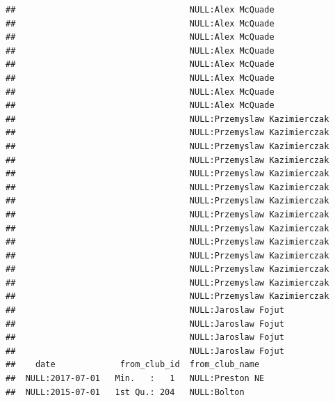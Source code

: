 \documentclass{article}\usepackage[]{graphicx}\usepackage[]{color}
\makeatletter
\newenvironment{kframe}{%
 \def\at@end@of@kframe{}%
 \ifinner\ifhmode%
  \def\at@end@of@kframe{\end{minipage}}%
  \begin{minipage}{\columnwidth}%
 \fi\fi%
 \def\FrameCommand##1{\hskip\@totalleftmargin \hskip-\fboxsep
 \colorbox{shadecolor}{##1}\hskip-\fboxsep
     \hskip-\linewidth \hskip-\@totalleftmargin \hskip\columnwidth}%
 \MakeFramed {\advance\hsize-\width
   \@totalleftmargin\z@ \linewidth\hsize
   \@setminipage}}%
 {\par\unskip\endMakeFramed%
 \at@end@of@kframe}
\newenvironment{knitrout}{}{} %
\makeatother
\begin{document}
\begin{knitrout}
\begin{kframe}
\begin{verbatim}
##                                   NULL:Alex McQuade                                    
##                                   NULL:Alex McQuade                                    
##                                   NULL:Alex McQuade                                    
##                                   NULL:Alex McQuade                                    
##                                   NULL:Alex McQuade                                    
##                                   NULL:Alex McQuade                                    
##                                   NULL:Alex McQuade                                    
##                                   NULL:Alex McQuade                                    
##                                   NULL:Przemyslaw Kazimierczak                         
##                                   NULL:Przemyslaw Kazimierczak                         
##                                   NULL:Przemyslaw Kazimierczak                         
##                                   NULL:Przemyslaw Kazimierczak                         
##                                   NULL:Przemyslaw Kazimierczak                         
##                                   NULL:Przemyslaw Kazimierczak                         
##                                   NULL:Przemyslaw Kazimierczak                         
##                                   NULL:Przemyslaw Kazimierczak                         
##                                   NULL:Przemyslaw Kazimierczak                         
##                                   NULL:Przemyslaw Kazimierczak                         
##                                   NULL:Przemyslaw Kazimierczak                         
##                                   NULL:Przemyslaw Kazimierczak                         
##                                   NULL:Przemyslaw Kazimierczak                         
##                                   NULL:Przemyslaw Kazimierczak                         
##                                   NULL:Jaroslaw Fojut                                  
##                                   NULL:Jaroslaw Fojut                                  
##                                   NULL:Jaroslaw Fojut                                  
##                                   NULL:Jaroslaw Fojut                                  
##    date             from_club_id  from_club_name                                 
##  NULL:2017-07-01   Min.   :   1   NULL:Preston NE                                
##  NULL:2015-07-01   1st Qu.: 204   NULL:Bolton                                    

\end{verbatim}
\end{kframe}
\end{knitrout}
\end{document}
